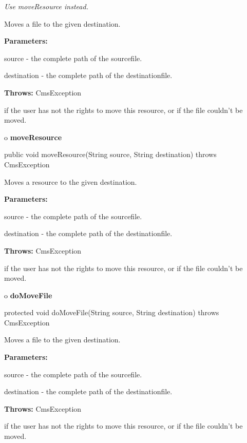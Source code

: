 \begin{description}
 {\it Use moveResource instead.} 

Moves a file to the given destination. 

\begin{description}
\item {\bf Parameters:}  

source - the complete path of the sourcefile.  

destination - the complete path of the destinationfile.  
\item {\bf Throws:} CmsException  

if the user has not the rights to move this resource, or if the file couldn't
be moved.  
\end{description}

\end{description}

o {\bf moveResource} 

\begin{PRE}
 public void moveResource(String source,
                          String destination) throws CmsException
\end{PRE}

\begin{description}
\htmlDD Moves a resource to the given destination. 

\begin{description}
\item {\bf Parameters:}  

source - the complete path of the sourcefile.  

destination - the complete path of the destinationfile.  
\item {\bf Throws:} CmsException  

if the user has not the rights to move this resource, or if the file couldn't
be moved.  
\end{description}

\end{description}

o {\bf doMoveFile} 

\begin{PRE}
 protected void doMoveFile(String source,
                           String destination) throws CmsException
\end{PRE}

\begin{description}
\htmlDD Moves a file to the given destination. 

\begin{description}
\item {\bf Parameters:}  

source - the complete path of the sourcefile.  

destination - the complete path of the destinationfile.  
\item {\bf Throws:} CmsException  

if the user has not the rights to move this resource, or if the file couldn't
be moved.  
\end{description}

\end{description}


